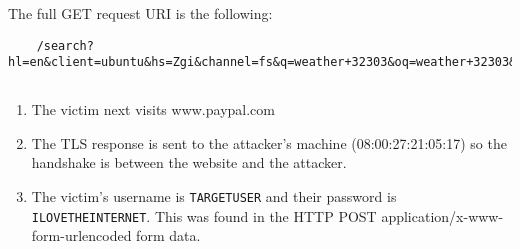 \documentclass[12pt]{exam}
\begin{document}
The full GET request URI is the following:

\begin{lstlisting}
    /search?hl=en&client=ubuntu&hs=Zgi&channel=fs&q=weather+32303&oq=weather+32303&gs_l=serp.3..0l2j0i30l2j0i5i30l3j0i8j0i8i30l2.44912.47718.0.48648.15.9.1.5.5.0.118.808.7j2.9.0.les%3B..0.0...1c.1.4.serp.hEw2INguST0
\end{lstlisting}

\subsection{}

\begin{enumerate}[label=\alph*)]
    \item The victim next visits www.paypal.com
    \item The TLS response is sent to the attacker's machine (08:00:27:21:05:17)
    so the handshake is between the website and the attacker.
    \item The victim's username is \lstinline{TARGETUSER} and their password is
    \lstinline{ILOVETHEINTERNET}.  This was found in the HTTP POST
    application/x-www-form-urlencoded form data.  
\end{enumerate}
\end{document}
